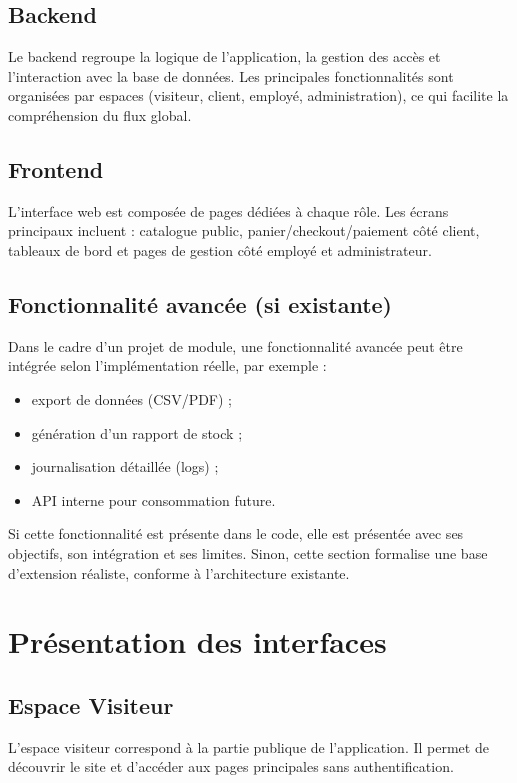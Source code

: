 \documentclass[12pt,a4paper]{report}
\begin{document}
\subsection{Backend}
Le backend regroupe la logique de l’application, la gestion des accès et l’interaction avec la base de données. Les principales fonctionnalités sont organisées par espaces (visiteur, client, employé, administration), ce qui facilite la compréhension du flux global.

\subsection{Frontend}
L’interface web est composée de pages dédiées à chaque rôle. Les écrans principaux incluent : catalogue public, panier/checkout/paiement côté client, tableaux de bord et pages de gestion côté employé et administrateur.

\subsection{Fonctionnalité avancée (si existante)}
Dans le cadre d’un projet de module, une fonctionnalité avancée peut être intégrée selon l’implémentation réelle, par exemple :
\begin{itemize}
    \item export de données (CSV/PDF) ;
    \item génération d’un rapport de stock ;
    \item journalisation détaillée (logs) ;
    \item API interne pour consommation future.
\end{itemize}
Si cette fonctionnalité est présente dans le code, elle est présentée avec ses objectifs, son intégration et ses limites. Sinon, cette section formalise une base d’extension réaliste, conforme à l’architecture existante.

\section{Présentation des interfaces}

\subsection*{Espace Visiteur}
L’espace visiteur correspond à la partie publique de l’application. Il permet de découvrir le site et d’accéder aux pages principales sans authentification.
\end{document}
